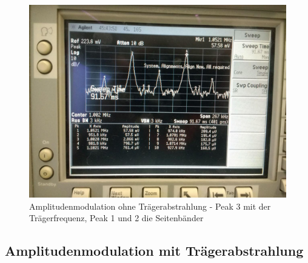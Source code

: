 \begin{figure}
	\centering
	\includegraphics[width=\textwidth]{img/Aufgabenteil_b.jpg}
	\caption{Amplitudenmodulation ohne Trägerabstrahlung - Peak 3 mit der Trägerfrequenz, Peak 1 und 2 die Seitenbänder}
	\label{b}
\end{figure}

\subsection{Amplitudenmodulation mit Trägerabstrahlung}

